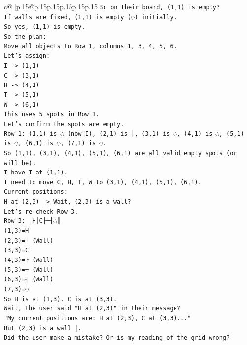 \documentclass{article}
\begin{document}
{\begin{supertabular}{c@{$\;$}|p{.15\linewidth}@{}p{.15\linewidth}p{.15\linewidth}p{.15\linewidth}p{.15\linewidth}p{.15\linewidth}}
{{{\texttt{So on their board, (1,1) is empty?} \\
\texttt{If walls are fixed, (1,1) is empty (◌) initially.} \\
\texttt{So yes, (1,1) is empty.} \\
\texttt{So the plan:} \\
\texttt{Move all objects to Row 1, columns 1, 3, 4, 5, 6.} \\
\texttt{Let's assign:} \\
\texttt{I {-}> (1,1)} \\
\texttt{C {-}> (3,1)} \\
\texttt{H {-}> (4,1)} \\
\texttt{T {-}> (5,1)} \\
\texttt{W {-}> (6,1)} \\
\texttt{This uses 5 spots in Row 1.} \\
\texttt{Let's confirm the spots are empty.} \\
\texttt{Row 1: (1,1) is ◌ (now I), (2,1) is │, (3,1) is ◌, (4,1) is ◌, (5,1) is ◌, (6,1) is ◌, (7,1) is ◌.} \\
\texttt{So (1,1), (3,1), (4,1), (5,1), (6,1) are all valid empty spots (or will be).} \\
\texttt{I have I at (1,1).} \\
\texttt{I need to move C, H, T, W to (3,1), (4,1), (5,1), (6,1).} \\
\texttt{Current positions:} \\
\texttt{H at (2,3) {-}> Wait, (2,3) is a wall?} \\
\texttt{Let's re{-}check Row 3.} \\
\texttt{Row 3: ║H│C├─┤◌║} \\
\texttt{(1,3)=H} \\
\texttt{(2,3)=│ (Wall)} \\
\texttt{(3,3)=C} \\
\texttt{(4,3)=├ (Wall)} \\
\texttt{(5,3)=─ (Wall)} \\
\texttt{(6,3)=┤ (Wall)} \\
\texttt{(7,3)=◌} \\
\texttt{So H is at (1,3). C is at (3,3).} \\
\texttt{Wait, the user said "H at (2,3)" in their message?} \\
\texttt{"My current positions are: H at (2,3), C at (3,3)..."} \\
\texttt{But (2,3) is a wall │.} \\
\texttt{Did the user make a mistake? Or is my reading of the grid wrong?} \\
}}}
\end{supertabular}}
\end{document}

